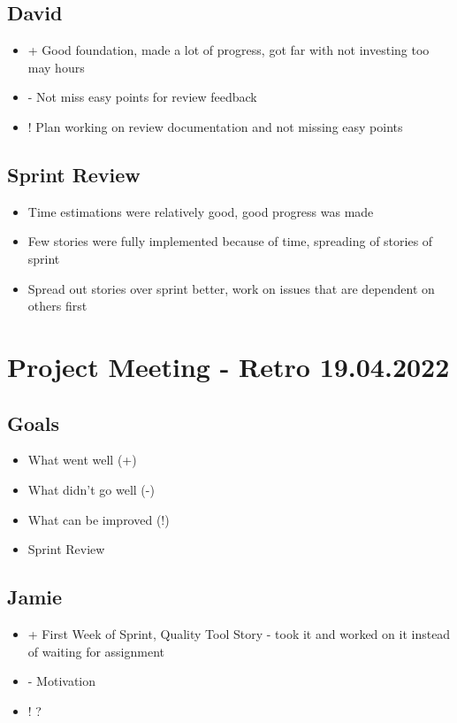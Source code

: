 \subsection{David}
\begin{itemize}
    \item + Good foundation, made a lot of progress, got far with not investing too may hours
    \item - Not miss easy points for review feedback
    \item ! Plan working on review documentation and not missing easy points
\end{itemize}

\subsection{Sprint Review}
\begin{itemize}
    \item Time estimations were relatively good, good progress was made
    \item Few stories were fully implemented because of time, spreading of stories of sprint
    \item Spread out stories over sprint better, work on issues that are dependent on others first
\end{itemize}


\section{Project Meeting - Retro 19.04.2022}

\subsection{Goals}
\begin{itemize}
    \item What went well (+)
    \item What didn't go well (-)
    \item What can be improved (!)
    \item Sprint Review
\end{itemize}

\subsection{Jamie}
\begin{itemize}
    \item + First Week of Sprint, Quality Tool Story - took it and worked on it instead of waiting for assignment
    \item - Motivation
    \item ! ?
\end{itemize}

